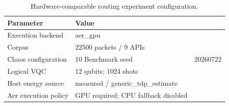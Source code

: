 \begin{table}[htbp]
\caption{Hardware-comparable routing experiment configuration.}
\label{tab:routing-experiment-configuration}
\centering
\begin{tabular}{ll}
\hline
Parameter & Value \\
\hline
Execution backend & aer\_gpu \\
Corpus & 22500 packets / 9 APIs \\
Chaos configuration & 10%
Benchmark seed & 20260722 \\
Logical VQC & 12 qubits; 1024 shots \\
Host energy source & measured / generic\_tdp\_estimate \\
Aer execution policy & GPU required; CPU fallback disabled \\
\hline
\end{tabular}
\end{table}
